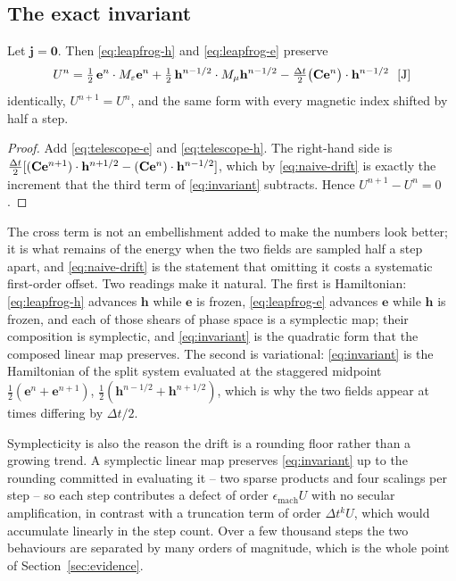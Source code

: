 \subsection{The exact invariant}
\label{sec:invariant}

\begin{proposition}
\label{prop:invariant}
Let $\mathbf{j}=\mathbf{0}$. Then \eqref{eq:leapfrog-h} and \eqref{eq:leapfrog-e} preserve
\begin{equation}
  U^{n} = \tfrac12\,\mathbf{e}^{n}\cdot{M_{\varepsilon}}\mathbf{e}^{n}
        + \tfrac12\,\mathbf{h}^{n-1/2}\cdot{M_{\mu}}\mathbf{h}^{n-1/2}
        - \tfrac{\Delta t}{2}\bigl(\mathbf{C}\mathbf{e}^{n}\bigr)\cdot\mathbf{h}^{n-1/2}
  \ \ [\mathrm{J}]
  \label{eq:invariant}
\end{equation}
identically, $U^{n+1}=U^{n}$, and the same form with every magnetic index shifted by half a step.
\end{proposition}

\begin{proof}
Add \eqref{eq:telescope-e} and \eqref{eq:telescope-h}. The right-hand side is
$\tfrac{\Delta t}{2}[(\mathbf{C}\mathbf{e}^{n+1})\cdot\mathbf{h}^{n+1/2}-(\mathbf{C}\mathbf{e}^{n})\cdot
\mathbf{h}^{n-1/2}]$, which by \eqref{eq:naive-drift} is exactly the increment that the third term of
\eqref{eq:invariant} subtracts. Hence $U^{n+1}-U^{n}=0$.
\end{proof}

The cross term is not an embellishment added to make the numbers look better; it is what remains of the energy
when the two fields are sampled half a step apart, and \eqref{eq:naive-drift} is the statement that omitting it
costs a systematic first-order offset. Two readings make it natural. The first is Hamiltonian:
\eqref{eq:leapfrog-h} advances $\mathbf{h}$ while $\mathbf{e}$ is frozen, \eqref{eq:leapfrog-e} advances
$\mathbf{e}$ while $\mathbf{h}$ is frozen, and each of those shears of phase space is a symplectic map; their
composition is symplectic, and \eqref{eq:invariant} is the quadratic form that the composed linear map preserves.
The second is variational: \eqref{eq:invariant} is the Hamiltonian of the split system evaluated at the staggered
midpoint $\tfrac12(\mathbf{e}^{n}+\mathbf{e}^{n+1})$, $\tfrac12(\mathbf{h}^{n-1/2}+\mathbf{h}^{n+1/2})$, which is
why the two fields appear at times differing by $\Delta t/2$.

Symplecticity is also the reason the drift is a rounding floor rather than a growing trend. A symplectic linear
map preserves \eqref{eq:invariant} up to the rounding committed in evaluating it -- two sparse products and four
scalings per step -- so each step contributes a defect of order $\epsilon_{\mathrm{mach}}U$ with no secular
amplification, in contrast with a truncation term of order $\Delta t^{k}U$, which would accumulate linearly in the
step count. Over a few thousand steps the two behaviours are separated by many orders of magnitude, which is the
whole point of Section~\ref{sec:evidence}.

